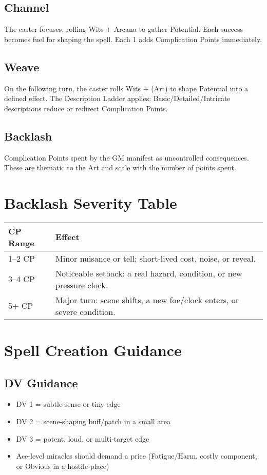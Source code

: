 \documentclass[11pt]{report}
\begin{document}
\subsection{Channel}
The caster focuses, rolling Wits + Arcana to gather Potential. Each success becomes fuel for shaping the spell. Each 1 adds Complication Points immediately.

\subsection{Weave}
On the following turn, the caster rolls Wits + (Art) to shape Potential into a defined effect. The Description Ladder applies: Basic/Detailed/Intricate descriptions reduce or redirect Complication Points.

\subsection{Backlash}
Complication Points spent by the GM manifest as uncontrolled consequences. These are thematic to the Art and scale with the number of points spent.

\section{Backlash Severity Table}

\begin{tabular}{|m{1in}|m{4in}|}
\hline
\textbf{CP Range} & \textbf{Effect} \\
\hline
1–2 CP & Minor nuisance or tell; short-lived cost, noise, or reveal. \\
\hline
3–4 CP & Noticeable setback: a real hazard, condition, or new pressure clock. \\
\hline
5+ CP & Major turn: scene shifts, a new foe/clock enters, or severe condition. \\
\hline
\end{tabular}

\section{Spell Creation Guidance}

\subsection{DV Guidance}
\begin{itemize}
    \item DV 1 = subtle sense or tiny edge
    \item DV 2 = scene-shaping buff/patch in a small area
    \item DV 3 = potent, loud, or multi-target edge
    \item Ace-level miracles should demand a price (Fatigue/Harm, costly component, or Obvious in a hostile place)
\end{itemize}
\end{document}
